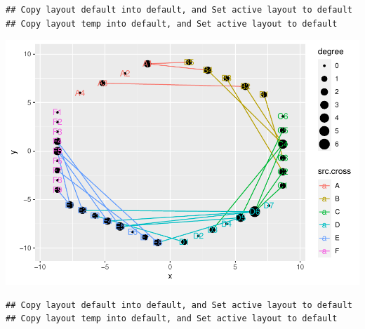 \documentclass[
]{article}
\newenvironment{Shaded}{\begin{snugshade}}{\end{snugshade}}
\newcommand{\CommentTok}[1]{\textcolor[rgb]{0.56,0.35,0.01}{\textit{#1}}}
\newcommand{\KeywordTok}[1]{\textcolor[rgb]{0.13,0.29,0.53}{\textbf{#1}}}
\newcommand{\NormalTok}[1]{#1}
\newcommand{\OperatorTok}[1]{\textcolor[rgb]{0.81,0.36,0.00}{\textbf{#1}}}
\newcommand{\StringTok}[1]{\textcolor[rgb]{0.31,0.60,0.02}{#1}}
\begin{document}
\begin{Shaded}
\end{Shaded}

\begin{verbatim}
## Copy layout default into default, and Set active layout to default
## Copy layout temp into default, and Set active layout to default
\end{verbatim}

\includegraphics{ReadMe_files/figure-latex/unnamed-chunk-7-5.pdf}

\begin{Shaded}
\end{Shaded}

\begin{verbatim}
## Copy layout default into default, and Set active layout to default
## Copy layout temp into default, and Set active layout to default
\end{verbatim}
\end{document}
